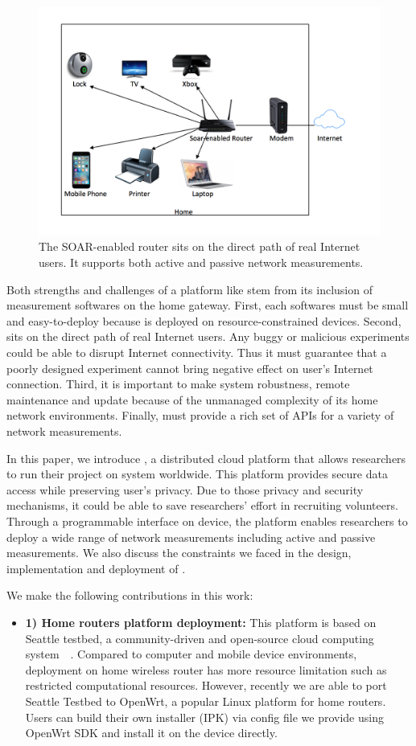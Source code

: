 {\begin{figure}%
\centering
\includegraphics[width=0.8\columnwidth]{figure/home-network.png}
\caption{The SOAR-enabled router sits on the direct path of real
Internet users. It supports both active and passive network measurements.}
\label{figure:design}
\end{figure}

Both strengths and challenges of a platform like \sysname stem from
its inclusion of measurement softwares on the home gateway. First, each softwares must be small and easy-to-deploy because \sysname is deployed on resource-constrained devices. Second, \sysname sits on the direct path of real Internet users. Any buggy or malicious experiments could be able to disrupt Internet connectivity. Thus it must guarantee that a poorly designed experiment cannot bring negative effect on user's Internet connection. Third, it is important to make system robustness, remote maintenance and update because of the unmanaged complexity of its home network environments. Finally, \sysname must provide a rich set of APIs for a variety of network measurements.

In this paper, we introduce \sysname, a distributed cloud platform that allows researchers to run their project on system worldwide. This platform provides secure data access while preserving user's privacy. Due to those privacy and security mechanisms, it could be able to save researchers' effort in recruiting volunteers. Through a programmable interface on device, the platform enables researchers to deploy a wide range of network measurements including active and passive measurements. We also discuss the constraints we faced in the design, implementation and deployment of \sysname.

We make the following contributions in this work:
{\raggedright
\begin{itemize}
\item\textbf{1) Home routers platform deployment:} This platform is based on Seattle testbed, a community-driven and open-source cloud computing system~\cite{zhuang2013experience}~\cite{cappos2009seattle}. Compared to computer and mobile device environments, deployment on home wireless router has more resource limitation such as restricted computational resources. However, recently we are able to port Seattle Testbed to OpenWrt, a popular Linux platform for home routers\cite{openwrt}. Users can build their own \sysname installer (IPK) via config file we provide using OpenWrt SDK and install it on the device directly.


\end{itemize}}}
